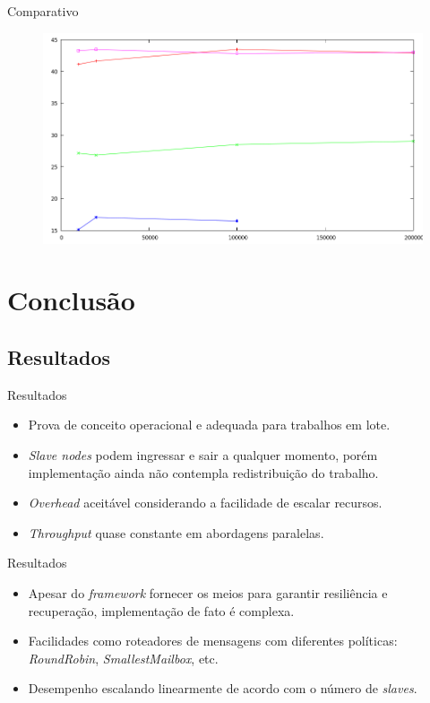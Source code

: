 \documentclass{beamer}
\begin{document}
	\begin{frame}{Comparativo}
		\begin{figure}[H]
			\includegraphics[scale=0.32]{img/graph_throughput.png}
			\label{fig:screen_mapreduce}
		\end{figure}
	\end{frame}

\section{Conclusão}
	\subsection{Resultados}
		\begin{frame}{Resultados}
			\begin{itemize}
				\item Prova de conceito operacional e adequada para trabalhos em lote.
				\item \textit{Slave nodes} podem ingressar e sair a qualquer momento, porém implementação ainda não contempla redistribuição do trabalho.
				\item \textit{Overhead} aceitável considerando a facilidade de escalar recursos.
				\item \textit{Throughput} quase constante em abordagens paralelas.
			\end{itemize}
		\end{frame}

		\begin{frame}{Resultados}
			\begin{itemize}
				\item Apesar do \textit{framework} fornecer os meios para garantir resiliência e recuperação, implementação de fato é complexa.
				\item Facilidades como roteadores de mensagens com diferentes políticas: \textit{RoundRobin}, \textit{SmallestMailbox}, etc.
				\item Desempenho escalando linearmente de acordo com o número de \textit{slaves}.
			\end{itemize}
		\end{frame}
\end{document}
